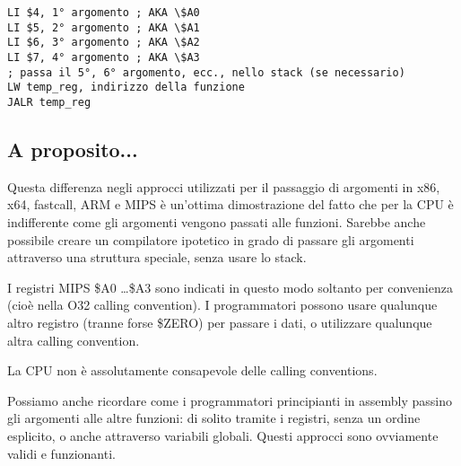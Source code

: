 \begin{lstlisting}[caption=MIPS (O32 calling convention),style=customasmMIPS]
LI $4, 1° argomento ; AKA \$A0
LI $5, 2° argomento ; AKA \$A1
LI $6, 3° argomento ; AKA \$A2
LI $7, 4° argomento ; AKA \$A3
; passa il 5°, 6° argomento, ecc., nello stack (se necessario)
LW temp_reg, indirizzo della funzione
JALR temp_reg
\end{lstlisting}

\subsection{A proposito...}

Questa differenza negli approcci utilizzati per il passaggio di argomenti in x86, x64,
fastcall, ARM e MIPS è un'ottima dimostrazione del fatto che per la CPU è indifferente come gli argomenti vengono passati alle funzioni.
Sarebbe anche possibile creare un compilatore ipotetico in grado di passare gli argomenti
attraverso una struttura speciale, senza usare lo stack.

I registri MIPS \$A0 \dots \$A3 sono indicati in questo modo soltanto per convenienza (cioè nella O32 calling convention).
I programmatori possono usare qualunque altro registro (tranne forse \$ZERO)
per passare i dati, o utilizzare qualunque altra calling convention.

La \ac{CPU} non è assolutamente consapevole delle calling conventions.

Possiamo anche ricordare come i programmatori principianti in assembly passino gli argomenti alle altre funzioni:
di solito tramite i registri, senza un ordine esplicito, o anche attraverso variabili globali.
Questi approcci sono ovviamente validi e funzionanti.
